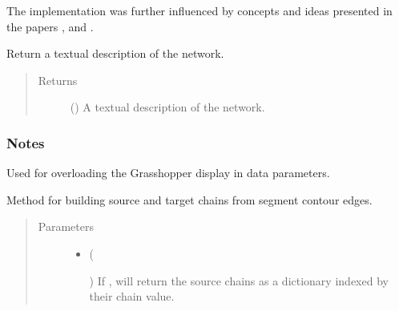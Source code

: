 \documentclass[letterpaper,10pt,english]{sphinxmanual}
\begin{document}
\begin{fulllineitems}
The implementation was further influenced by concepts and ideas presented
in the papers  \sphinxfootnotemark[3],
 \sphinxfootnotemark[4] and
 \sphinxfootnotemark[5].

\begin{fulllineitems}
\label{\detokenize{cockatoo:cockatoo.KnitMappingNetwork.ToString}}
Return a textual description of the network.
\begin{quote}\begin{description}
\item[{Returns}] \leavevmode
{} () \textendash{} A textual description of the network.

\end{description}\end{quote}
\subsubsection*{Notes}

Used for overloading the Grasshopper display in data parameters.

\end{fulllineitems}


\begin{fulllineitems}
\label{\detokenize{cockatoo:cockatoo.KnitMappingNetwork.build_chains}}
Method for building source and target chains from segment
contour edges.
\begin{quote}\begin{description}
\item[{Parameters}] \leavevmode\begin{itemize}
\item {} 
 (%
\begin{footnote}[155]\sphinxAtStartFootnote
{}
%
\end{footnote}) \textendash{} If , will return the source chains as a dictionary indexed
by their chain value.


\end{itemize}
\end{description}
\end{quote}
\end{fulllineitems}
\end{fulllineitems}
\end{document}
